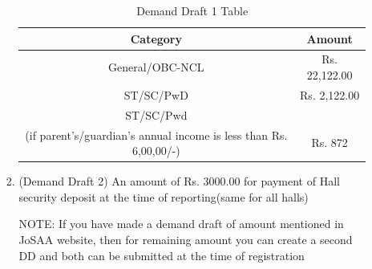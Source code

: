 \documentclass[11pt]{article}
\begin{document}
\begin{itemize}
\begin{itemize}
\begin{enumerate}
\begin{table}[H]
\centering
\begin{tabular}{ | c | c | }
\hline
 \textbf{Category} & \textbf{Amount} \\ 
 \hline
 General/OBC-NCL & Rs. 22,122.00 \\
 \hline  
 ST/SC/PwD & Rs. 2,122.00 \\
 \hline
 ST/SC/Pwd &  \\ 
 (if parent's/guardian's annual income is less than Rs. 6,00,00/-) & Rs. 872 \\
 \hline   
\end{tabular}
\caption{Demand Draft 1 Table}
\label{table:1}
\end{table}	
		\item (Demand Draft 2) An amount of Rs. 3000.00 for payment of Hall security deposit at the time of reporting(same for all halls)
		
		NOTE: If you have made a demand draft of amount mentioned in JoSAA website, then for remaining amount you can create a second DD and both can be submitted at the time of registration
		\end{enumerate}
	\end{itemize}
\end{itemize}
\end{document}
